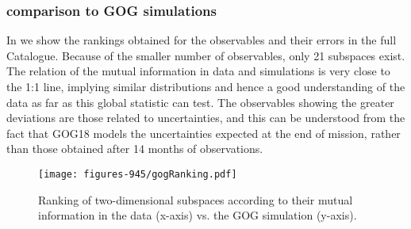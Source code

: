 \subsubsection{{} comparison to GOG simulations}

In  we show the rankings obtained for the
observables and their errors in the full {} Catalogue. Because of the smaller number of
observables, only 21 subspaces exist. The relation of
the mutual information in data and simulations is very close to the
1:1 line, implying similar distributions and hence a good
understanding of the data as far as this global statistic can
test. The observables showing the greater deviations are those related
to uncertainties, and this can be understood from the fact that GOG18 models 
the uncertainties expected at the end of mission, rather than those obtained after 14 months of
observations. 

\begin{figure}
\begin{center}
\texttt{[image: figures-945/gogRanking.pdf]}
\caption{Ranking of two-dimensional subspaces according to their mutual
information in the {} data (x-axis) vs. the GOG simulation (y-axis).}\label{fig:rank_dr1_wp945}
\end{center}
\end{figure}


